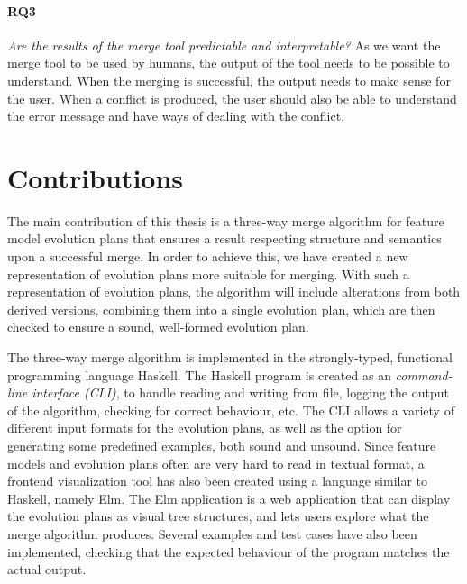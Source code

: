 \documentclass[a4paper,english]{ifimaster}
\begin{document}
\paragraph{RQ3}

\textit{Are the results of the merge tool predictable and interpretable?} As we want the merge tool to be used by humans, the output of the tool needs to be possible to understand. When the merging is successful, the output needs to make sense for the user. When a conflict is produced, the user should also be able to understand the error message and have ways of dealing with the conflict.


\section{Contributions}%
\label{sec:contributions}

The main contribution of this thesis is a three-way merge algorithm for feature model evolution plans that ensures a result respecting structure and semantics upon a successful merge. In order to achieve this, we have created a new representation of evolution plans more suitable for merging. With such a representation of evolution plans, the algorithm will include alterations from both derived versions, combining them into a single evolution plan, which are then checked to ensure a sound, well-formed evolution plan.

The three-way merge algorithm is implemented in the strongly-typed, functional programming language Haskell. The Haskell program is created as an \textit{command-line interface (CLI)}, to handle reading and writing from file, logging the output of the algorithm, checking for correct behaviour, etc. The CLI allows a variety of different input formats for the evolution plans, as well as the option for generating some predefined examples, both sound and unsound. Since feature models and evolution plans often are very hard to read in textual format, a frontend visualization tool has also been created using a language similar to Haskell, namely Elm. The Elm application is a web application that can display the evolution plans as visual tree structures, and lets users explore what the merge algorithm produces. Several examples and test cases have also been implemented, checking that the expected behaviour of the program matches the actual output.
\end{document}
